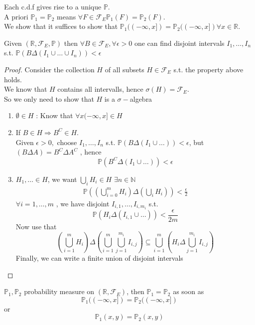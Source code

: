 \documentclass[../main.tex]{subfiles}
\begin{document}
Each c.d.f gives rise to a unique $ \mathbb{P}$.\\
A priori $ \mathbb{P}_1 = \mathbb{P}_2$ means $\forall F \in \mathcal{F}_E \mathbb{P}_1( F) = \mathbb{P}_2( F)  $.\\
We show that it suffices to show that $ \mathbb{P}_1(  ( - \infty ,x] )= \mathbb{P}_2 ( ( - \infty ,x] ) \forall x \in \mathbb{R} $.
\begin{lemma}
	Given $ ( \mathbb{R}, \mathcal{F}_E, \mathbb{P}) $ then $ \forall B \in \mathcal{F}_E, \forall \epsilon>0$ one can find disjoint intervals $I_1,\ldots, I_n$ s.t. $ \mathbb{P}( B \Delta ( I_1\cup \ldots\cup I_n) ) < \epsilon$ 
\end{lemma}
\begin{proof}
Consider the collection $H$ of all subsets $H \in \mathcal{F}_E$ s.t. the property above holds.\\
We know that $H$ contains all intervalls, hence $\sigma( H) = \mathcal{F}_E$.\\
So we only need to show that $H$ is a $\sigma-$algebra
\begin{enumerate}
	\item $\emptyset \in H$ : Know that $\forall x ( - \infty , x] \in H$ 
	\item If $B \in H \Rightarrow B^{C}\in H$.\\
		Given $\epsilon>0,$ choose $I_1,\ldots, I_n$ s.t. $ \mathbb{P}( B\Delta ( I_1\cup\ldots) )< \epsilon $, but $ ( B\Delta A)= B^{C}\Delta A^{C}$ , hence
		\[ 
			\mathbb{P}( B^{C}\Delta (I_1\cup \ldots ) ) < \epsilon
		\]
		
	\item $H_1,\ldots\in H$, we want $\bigcup_i H_i \in H$ 
		$\exists n \in \mathbb{N}$ 
		\begin{align*}
			\mathbb{P}(  ( \bigcup_{i=0}^{m} H_i) \Delta (\bigcup_{i} H_i ) ) < \frac{\epsilon}{2}		
		\end{align*}
	$\forall i = 1,\ldots,m$ , we have disjoint $I_{i,1} ,\ldots, I_{i,m_i}$ s.t.
	\[ 
		\mathbb{P}( H_i \Delta( I_{i,1} \cup\ldots) ) < \frac{\epsilon}{2m}
	\]
	Now use that
	\[ 
		( \bigcup_{i=1}^{m}H_i) \Delta ( \bigcup_{i=1} ^{m}\bigcup_{j=1}^{m_i} I_{i,j}  ) \subseteq \bigcup_{i=1} ^{m} ( H_i\Delta \bigcup_{j=1} ^{m_i}I_{i,j} ) 
	\]
	Finally, we can write a finite union of disjoint intervals
\end{enumerate}

\end{proof}
\begin{crly}
	$\mathbb{P}_1, \mathbb{P}_2$ probability measure on $ ( \mathbb{R}, \mathcal{F}_E) $, then $ \mathbb{P}_1= \mathbb{P}_2$ as soon as
	\[ 
		\mathbb{P}_1( ( - \infty, x] ) = \mathbb{P}_2 ( ( - \infty , x] ) 
	\]
	or
	\[ 
		\mathbb{P}_1 ( x,y) = \mathbb{P}_2 ( x,y) 
	\]
	
\end{crly}
\end{document}
